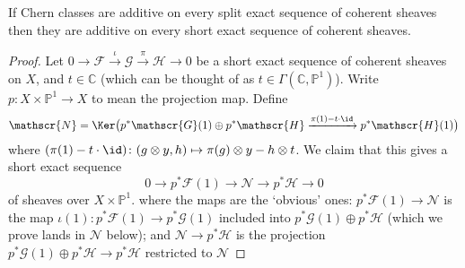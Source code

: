     \begin{lemma}\label{lemma:split-exact-suffices}
        If Chern classes are additive on every split exact sequence of coherent sheaves then they are additive on every short exact sequence of coherent sheaves.
    \end{lemma}

    \begin{proof}
        Let $0\to\mathscr{F}\xrightarrow{\iota}\mathscr{G}\xrightarrow{\pi}\mathscr{H}\to0$ be a short exact sequence of coherent sheaves on $X$, and $t\in\mathbb{C}$ (which can be thought of as $t\in\Gamma(\mathbb{C},\mathbb{P}^1)$).
        Write $p\colon X\times\mathbb{P}^1\to X$ to mean the projection map.
        Define
        \begin{equation*}
            \mathscr{N} = \Ker\big(p^*\mathscr{G}(1)\oplus p^*\mathscr{H}\xrightarrow{\pi(1)-t\cdot\id}p^*\mathscr{H}(1)\big)
        \end{equation*}
        where $(\pi(1)-t\cdot\id)\colon (g\otimes y, h)\mapsto \pi(g)\otimes y - h\otimes t$.
        We claim that this gives a short exact sequence
        \begin{equation}\label{equation:ses-p1-inv}
            0\to p^*\mathscr{F}(1)\to\mathscr{N}\to p^*\mathscr{H}\to0
        \end{equation}
        of sheaves over $X\times\mathbb{P}^1$.
        where the maps are the `obvious' ones: $p^*\mathscr{F}(1)\to\mathscr{N}$ is the map $\iota(1)\colon p^*\mathscr{F}(1)\to p^*\mathscr{G}(1)$ included into $p^*\mathscr{G}(1)\oplus p^*\mathscr{H}$ (which we prove lands in $\mathscr{N}$ below); and $\mathscr{N}\to p^*\mathscr{H}$ is the projection $p^*\mathscr{G}(1)\oplus p^*\mathscr{H}\to p^*\mathscr{H}$ restricted to $\mathscr{N}$
        

\end{proof}
